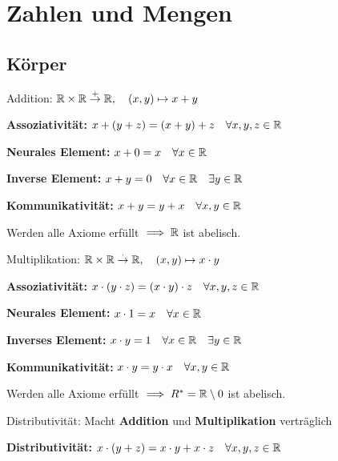 
\section{Zahlen und Mengen}

\subsection{Körper}
\begin{compactdesc}
    \item[Addition:] $\mathbb{R} \times \mathbb{R} \overset{+}{\to} \mathbb{R}, \quad (x, y) \mapsto x + y$
        \begin{compactenum}[{A}.1]
            \item \textbf{Assoziativität:} $x + \left( y + z \right) = \left( x + y \right) + z  \quad \forall x,y,z \in \mathbb{R}$
            \item \textbf{Neurales Element:} $x + 0 = x \quad \forall x \in \mathbb{R}$
            \item \textbf{Inverse Element:} $x + y = 0 \quad  \forall x \in \mathbb{R} \quad \exists y \in \mathbb{R}$
            \item \textbf{Kommunikativität:} $x + y = y + x \quad \forall x,y \in  \mathbb{R}$
        \end{compactenum}
     Werden alle Axiome erfüllt $\implies \mathbb{R}$ ist abelisch.
 \item[Multiplikation:] $\mathbb{R} \times \mathbb{R} \overset{\cdot}{\to} \mathbb{R}, \quad (x, y) \mapsto x \cdot y$
        \begin{compactenum}[{M}.1]
            \item \textbf{Assoziativität:} $x \cdot \left( y \cdot z \right) = \left( x \cdot y \right) \cdot z \quad \forall x,y,z \in \mathbb{R}$
            \item \textbf{Neurales Element:} $x \cdot  1 = x \quad \forall x \in \mathbb{R}$
            \item \textbf{Inverses Element:} $x \cdot y = 1 \quad \forall  x \in \mathbb{R} \quad \exists y \in \mathbb{R}$
            \item \textbf{Kommunikativität:} $x \cdot y = y \cdot x \quad \forall x,y \in \mathbb{R}$
        \end{compactenum}
    Werden alle Axiome erfüllt $\implies R^* = \mathbb{R} \setminus 0$ ist abelisch.
    \item[Distributivität:] Macht \textbf{Addition} und \textbf{Multiplikation} verträglich
        \begin{compactenum}[{D}.1]
            \item \textbf{Distributivität:} $x \cdot \left( y + z \right) = x \cdot y + x \cdot z \quad \forall x,y,z \in \mathbb{R}$

\end{compactenum}
\end{compactdesc}
